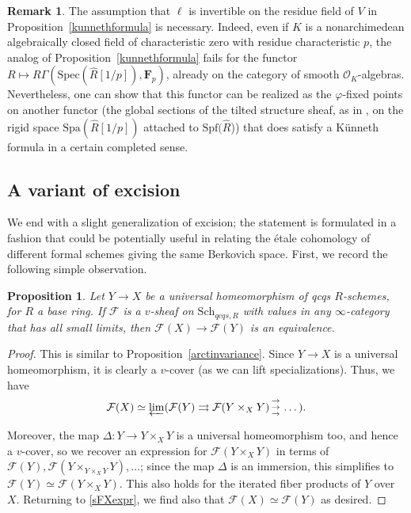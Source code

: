 \documentclass[reqno]{amsart}
\newcommand{\triplearrows}{\begin{smallmatrix} \to \\ \to \\ 
\to \end{smallmatrix} }
\newcommand{\sF}{\mathcal{F}}
\newcommand{\spec}{\mathrm{Spec}}
\newtheorem{proposition}[theorem]{Proposition}
\theoremstyle{definition}
\newtheorem{remark}[theorem]{Remark}
\begin{document}
\begin{remark} 
The assumption that $\ell$ is invertible on the residue field of $V$ in Proposition~\ref{kunnethformula} is necessary. Indeed, even if $K$ is a nonarchimedean algebraically closed field of characteristic zero with residue  characteristic $p$,  the analog of Proposition~\ref{kunnethformula} fails for the functor $R \mapsto R\Gamma(\spec(\widehat{R}[1/p]), \mathbf{F}_p)$, already on the category of smooth $\mathcal{O}_K$-algebras. Nevertheless, one can show that this functor can be realized as the $\varphi$-fixed points on another functor (the global sections of the tilted structure sheaf, as in \cite{ScholzeRigid}, on the rigid space $\mathrm{Spa}(\widehat{R}[1/p])$ attached to $\mathrm{Spf}(\widehat{R}$)) that does satisfy a K\"unneth formula in a certain completed sense. 
\end{remark} 

\subsection{A variant of excision}
We end with a slight  generalization of excision; the statement is formulated in a fashion that could be potentially useful in relating the \'etale cohomology of different formal schemes giving the same Berkovich space.  First, we record the following simple observation. 
\begin{proposition} 
\label{univhomeo}
Let $Y \to X$ be a universal homeomorphism of qcqs $R$-schemes, for $R$ a base
ring. If $\sF$ is a
$v$-sheaf on $\mathrm{Sch}_{qcqs, R}$ with values in any $\infty$-category that
has all small limits, then  $\sF(X) \to \sF(Y)$ is an equivalence. 
\end{proposition} 
\begin{proof} 
This is similar to Proposition~\ref{arctinvariance}. 
Since $Y \to X$ is a universal homeomorphism, it is clearly a $v$-cover (as we
can lift specializations). Thus, we have
\begin{equation} \label{sFXexpr} \sF(X) \simeq \varprojlim ( \sF(Y) \rightrightarrows \sF(Y \times_X Y)
\triplearrows \dots ).   \end{equation}

Moreover, the map $\Delta\colon  Y \to Y \times_X Y$ is a universal homeomorphism too, and
hence a $v$-cover,
so we recover an expression for $\sF(Y \times_X Y)$ in terms of 
$\sF(Y), \sF(Y \times_{Y \times_X Y} Y), \dots$; since the 
map $\Delta$ is an immersion, this simplifies to $\sF(Y) \simeq \sF(Y \times_X
Y)$. This also holds for the iterated fiber products of $Y$ over $X$. 
Returning to \eqref{sFXexpr}, we find also that $\sF(X) \simeq \sF(Y)$ as
desired. 
\end{proof} 
\end{document}
